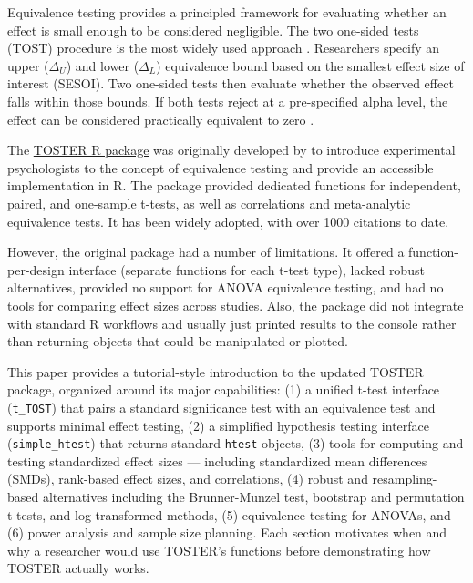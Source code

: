 \documentclass[]{interact}
\theoremstyle{plain}%
\theoremstyle{definition}
\theoremstyle{remark}
\begin{document}
Equivalence testing provides a principled framework for evaluating
whether an effect is small enough to be considered negligible. The two
one-sided tests (TOST) procedure is the most widely used approach
\citep{schuirmann1987}. Researchers specify an upper (\(\Delta_U\)) and
lower (\(\Delta_L\)) equivalence bound based on the smallest effect size
of interest (SESOI). Two one-sided tests then evaluate whether the
observed effect falls within those bounds. If both tests reject at a
pre-specified alpha level, the effect can be considered practically
equivalent to zero \citep{lakens_ori}.

The \href{https://aaroncaldwell.us/TOSTERpkg}{TOSTER R package} was
originally developed by \citet{lakens_ori} to introduce experimental
psychologists to the concept of equivalence testing and provide an
accessible implementation in R. The package provided dedicated functions
for independent, paired, and one-sample t-tests, as well as correlations
and meta-analytic equivalence tests. It has been widely adopted, with
over 1000 citations to date.

However, the original package had a number of limitations. It offered a
function-per-design interface (separate functions for each t-test type),
lacked robust alternatives, provided no support for ANOVA equivalence
testing, and had no tools for comparing effect sizes across studies.
Also, the package did not integrate with standard R workflows and
usually just printed results to the console rather than returning
objects that could be manipulated or plotted.

This paper provides a tutorial-style introduction to the updated TOSTER
package, organized around its major capabilities: (1) a unified t-test
interface (\texttt{t\_TOST}) that pairs a standard significance test
with an equivalence test and supports minimal effect testing, (2) a
simplified hypothesis testing interface (\texttt{simple\_htest}) that
returns standard \texttt{htest} objects, (3) tools for computing and
testing standardized effect sizes --- including standardized mean
differences (SMDs), rank-based effect sizes, and correlations, (4)
robust and resampling-based alternatives including the Brunner-Munzel
test, bootstrap and permutation t-tests, and log-transformed methods,
(5) equivalence testing for ANOVAs, and (6) power analysis and sample
size planning. Each section motivates when and why a researcher would
use TOSTER's functions before demonstrating how TOSTER actually works.
\end{document}

